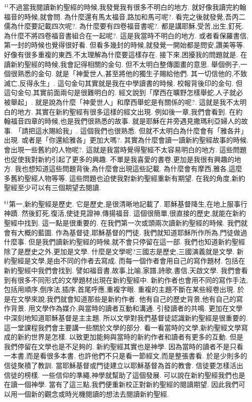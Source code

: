 \documentclass{book}
\begin{document}
$^{41}$不過當我閱讀新約聖經的時候,我發覺我有很多不明白的地方.
就好像我讀完約翰福音的時候,就會問.
為什麼還有馬太福音,路加和馬可呢?.
看完之後就發覺,吾丙二儒為什麼要記載四次呢?.
為什麼要有四卷福音書呢?.
都是講耶穌,受苦,出生,釘死.
為什麼不將四卷福音書組合在一起呢?.
這是我當時不明白的地方.
或者看保羅書信,第一封的時候也覺得很好看.
但看多幾封的時候,就發覺一開始都是問安,讚美等等.
好像有很多重複的東西,不太理解為什麼要這樣存在.
接下來,困擾我的問題就是.
在讀新約聖經的時候,我會記得相關的金句.
但不太明白整傳圖畫的意思.
舉個例子,一個很熟悉的金句.
就是「神愛世人,甚至將他的獨生子賜給他們.
其一切信他的,不致滅亡,反得永生」.
這句金句其實就是我在中學讀書的時候.
校報背後印的金句.
但這句金句,其實前面兩句是很難明白的.
經文說到「摩西在曠野怎樣舉蛇,人子就必被舉起」.
就是說為什麼「神愛世人」和摩西舉蛇是有關係的呢?.
這就是我不太明白的地方.
其實在新約聖經有很多這樣的經文出現.
例如後一章,我們會看到.
在約翰福音四章的時候,也是我們很熟悉的故事.
就是耶穌在井旁遇見撒瑪利亞婦人的故事.
「請把這水賜給我」.
這個我們也很熟悉.
但就不太明白為什麼會有「雅各井」出現.
或者是「你還給雅各」更加大嗎?.
其實為什麼會讀一讀新約聖經故事的時候.
會出現一些舊約的人物呢?.
這就是我當時覺得聖經不太容易明白的地方.
這些問題也促使我對新約引起了更多的興趣.
不單是我喜愛的書卷,更加是我很有興趣的地方.
我也想知道這些問題背後,為什麼會出現這些記載.
為什麼會有摩西,雅各,這麼多舊約聖經人物等等.
這些問題也迫使我對新約聖經重新有期望.
在我的角度,新約聖經至少可以有三個期望去閱讀.

$^{81}$第一,新約聖經是歷史.
它是歷史,是很清晰地記載了.
耶穌基督降生,在地上服事行神蹟.
然後釘死,復活,使徒見證神,傳揚福音.
這個很簡單,很直接的歷史,就能在新約聖經中找到.
這一點是很重要的.
在我們第一次或頭兩次讀新約聖經的時候.
我們就會有大概的藍圖.
作為基督徒,耶穌基督的門徒.
我們就知道耶穌所作所為,門徒做過什麼事.
但是我們讀新約聖經的時候,就不會只停留在這一部.
我們也知道新約聖經除了是歷史之外,更加是文學.
什麼是文學呢?三國志是歷史,三國演義就是文學.
新約聖經是文學,是由不同的作者去寫成.
而每一個作者會用自己的寫作題材.
包括在新約聖經中我們會找到.
譬如福音書,故事,比喻,家譜,詩歌,書信,天啟文學.
我們會看到有很多不同形式的文學題材出現在新約聖經中.
新約作者也會用不同的寫作手法,包括用順序,倒序法,插序,首尾呼應,重複字眼.
重複的主題不斷在某些經卷出現.
於是在文學來說,我們就會知道那些是新約作者.
他有自己的歷史背景,他有自己的寫作背景.
用文學作為媒介,與當時的讀者互動和溝通.
引發讀者的共鳴.
更加在文學中深刻地知道耶穌基督是主主題.
所以文學對我們基督徒認識新約聖經是很重要的.
這一堂課程我們會主要講一些關於文學的部分.
看一看當時的文學,新約聖經文學寫成的新約世界是怎樣.
以致更加能夠與當時的新約作者和讀者有更多的互動.
但是我們停留在文學也是不足夠的.
新約聖經其實也是神學.
因為當時的讀者不是只看一本書,而是看很多本書.
也許他們不只是看一節經文,而是整張書看.
於是少則多的信徒聚積了教訓.
當耶穌基督或門徒建立以耶穌基督為首的教會.
信徒要怎樣活出信徒的榜樣.
一些信仰的準繩,神學就幫助了這個發展.
可以說在新約聖經我們也是在讀一個神學.
當有了這三點,我們便重新校正對新約聖經的閱讀期望.
因此我們可以用一個新的觀念或時光機閱讀的想法去閱讀新約聖經.
\end{document}
